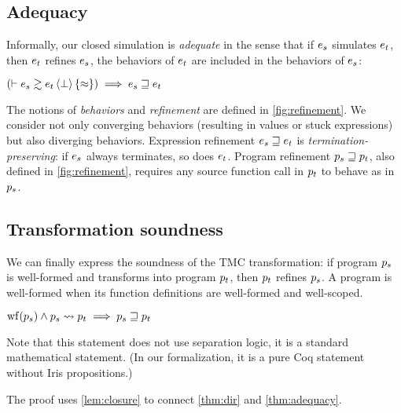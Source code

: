 \subsection{Adequacy}



Informally, our closed simulation is \emph{adequate} in the sense that if $\datalangExpr_s$ simulates $\datalangExpr_t$, then $\datalangExpr_t$ refines $\datalangExpr_s$, \ie the behaviors of $\datalangExpr_t$ are included in the behaviors of $\datalangExpr_s$:

\begin{lemma} \label{thm:adequacy}
    $
        \left( \vdash \iSimv[\bot]{\iSimilar}{\datalangExpr_s}{\datalangExpr_t} \right) \implies
        \datalangExpr_s \refined \datalangExpr_t
    $
\end{lemma}

The notions of \emph{behaviors} and \emph{refinement} are defined in \cref{fig:refinement}.
We consider not only converging behaviors (resulting in values or stuck expressions) but also diverging behaviors.
Expression refinement $\datalangExpr_s \refined \datalangExpr_t$ is \emph{termination-preserving}: if $\datalangExpr_s$ always terminates, so does $\datalangExpr_t$.
Program refinement $\datalangProg_s \refined \datalangProg_t$, also defined in \cref{fig:refinement}, requires any source function call in $\datalangProg_t$ to behave as in $\datalangProg_s$.

\subsection{Transformation soundness}

We can finally express the soundness of the TMC transformation: if program $\datalangProg_s$ is well-formed and transforms into program $\datalangProg_t$, then $\datalangProg_t$ refines $\datalangProg_s$.
A program is well-formed when its function definitions are well-formed and well-scoped.

\begin{theorem} \label{thm:soundness}
    $
        \wf{\datalangProg_s} \wedge \datalangProg_s \tmc \datalangProg_t \implies
        \datalangProg_s \refined \datalangProg_t
    $
\end{theorem}
Note that this statement does not use separation logic, it is a standard mathematical statement. (In our formalization, it is a pure Coq statement without Iris propositions.)

The proof uses \cref{lem:closure} to connect \cref{thm:dir} and \cref{thm:adequacy}.

